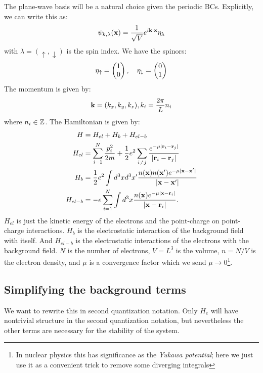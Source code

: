 The plane-wave basis will be a natural choice given the periodic BCs. Explicitly, we can write this as:
\begin{equation}
    \psi_{k, \lambda}(\mathbf{x}) = \frac{1}{\sqrt{V}}e^{i\mathbf{k} \cdot \mathbf{x}}\eta_\lambda
\end{equation}
with $\lambda = (\uparrow, \downarrow)$ is the spin index. We have the spinors:
\begin{equation}
    \eta_\uparrow = \begin{pmatrix}1\\0\end{pmatrix}, \quad \eta_\downarrow = \begin{pmatrix}0\\1\end{pmatrix}
\end{equation}
The momentum is given by:
\begin{equation}
    \mathbf{k} = (k_x, k_y, k_z), k_i = \frac{2\pi}{L}n_i
\end{equation}
where $n_i \in \mathbb{Z}$. The Hamiltonian is given by:
\begin{equation}
    \begin{split}
        H &= H_{el} + H_b + H_{el-b}
        \\ H_{el} &= \sum_{i=1}^N \frac{p_i^2}{2m} + \frac{1}{2}e^2\sum_{i \neq j} \frac{e^{-\mu\lvert \mathbf{r}_i - \mathbf{r}_j \rvert}}{\lvert \mathbf{r}_i - \mathbf{r}_j \rvert}
        \\ H_b &= \frac{1}{2}e^2 \int d^3x d^3x' \frac{n(\mathbf{x})n(\mathbf{x}')e^{-\mu\lvert \mathbf{x} - \mathbf{x}' \rvert}}{\lvert \mathbf{x} - \mathbf{x}' \rvert}
        \\ H_{el-b} &= -e\sum_{i=1}^N \int d^3x \frac{n(\mathbf{x})e^{-\mu\lvert \mathbf{x} - \mathbf{r}_i \rvert}}{\lvert \mathbf{x} - \mathbf{r}_i \rvert}.
    \end{split}
\end{equation}
$H_{el}$ is just the kinetic energy of the electrons and the point-charge on point-charge interactions. $H_b$ is the electrostatic interaction of the background field with itself. And $H_{el-b}$ is the electrostatic interactions of the electrons with the background field. $N$ is the number of electrons, $V = L^3$ is the volume, $n = N/V$ is the electron density, and $\mu$ is a convergence factor which we send $\mu \to 0$\footnote{In nuclear physics this has significance as the \emph{Yukawa potential}; here we just use it as a convenient trick to remove some diverging integrals}. 

\subsection{Simplifying the background terms}
We want to rewrite this in second quantization notation. Only $H_e$ will have nontrivial structure in the second quantization notation, but nevertheless the other terms are necessary for the stability of the system.

